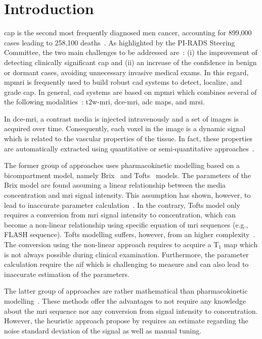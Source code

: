 \section{Introduction}

\Ac{cap} is the second most frequently diagnosed men cancer, accounting for 899,000 cases leading to 258,100 deaths~\citep{ferlay2010estimates}.
As highlighted by the PI-RADS Steering Committee, the two main challenges to be addressed are~\citep{weinreb2016pi}:
(i) the improvement of detecting clinically significant \ac{cap} and
(ii) an increase of the confidence in benign or dormant cases, avoiding unnecessary invasive medical exams.
In this regard, \ac{mpmri} is frequently used to build robust \ac{cad} systems to detect, localize, and grade \ac{cap}.
In general, \ac{cad} systems are based on \ac{mpmri} which combines several of the following modalities~\citep{lemaitre2015computer}: \ac{t2w}-\ac{mri}, \ac{dce}-\ac{mri}, \ac{adc} maps, and \ac{mrsi}.

In \ac{dce}-\ac{mri}, a contrast media is injected intravenously and a set of images is acquired over time.
Consequently, each voxel in the image is a dynamic signal which is related to the vascular properties of the tissue.
In fact, these properties are automatically extracted using quantitative or semi-quantitative approaches~\citep{lemaitre2015computer}.

The former group of approaches uses pharmacokinetic modelling based on a bicompartment model, namely Brix~\citep{brix1991pharmacokinetic} and Tofts~\citep{tofts1995quantitative} models.
The parameters of the Brix model are found assuming a linear relationship between the media concentration and \ac{mri} signal intensity.
This assumption has shown, however, to lead to inaccurate parameter calculation~\citep{heilmann2006determination}.
In the contrary, Tofts model only requires a conversion from \ac{mri} signal intensity to concentration, which can become a non-linear relationship using specific equation of \ac{mri} sequences (e.g., FLASH sequence).
Tofts modelling suffers, however, from an higher complexity~\citep{gliozzi2011phenomenological}.
The conversion using the non-linear approach requires to acquire a T$_1$ map which is not always possible during clinical examination.
Furthermore, the parameter calculation require the \ac{aif} which is challenging to measure and can also lead to inaccurate estimation of the parameters.

The latter group of approaches are rather mathematical than pharmacokinetic modelling~\citep{huisman2001accurate,gliozzi2011phenomenological}.
These methods offer the advantages to not require any knowledge about the \ac{mri} sequence nor any conversion from signal intensity to concentration.
However, the heuristic approach propose by \citeauthor{huisman2001accurate} requires an estimate regarding the noise standard deviation of the signal as well as manual tuning.

